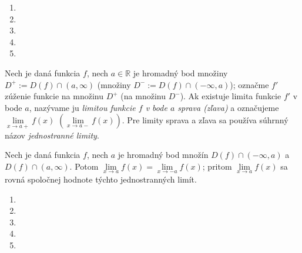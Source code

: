 \begin{enumerate}[resume]
  \item {}
  \item {}
  \item {}
  \item {}
  \item {}
\end{enumerate}

Nech je daná funkcia $f$, nech $a \in \mathbb{R}$ je hromadný bod množiny
$D^+:=D(f)\cap (a,\infty)$ (množiny $D^-:=D(f)\cap (-\infty,a)$); označme $f'$
zúženie funkcie na množinu $D^+$ (na množinu $D^-$). Ak existuje limita funkcie
$f'$ v bode $a$, nazývame ju \textit{limitou funkcie $f$ v bode $a$ sprava
(zľava)} a označujeme $\lim\limits_{x \rightarrow a+} f(x)$ $(\lim\limits_{x
\rightarrow a-} f(x))$. Pre limity sprava a zľava sa používa súhrnný názov
\textit{jednostranné limity}.

\begin{veta}
Nech je daná funkcia $f$, nech $a$ je hromadný bod množín $D(f) \cap
(-\infty,a)$ a $D(f) \cap (a,\infty)$. Potom $\lim\limits_{x \rightarrow a}
f(x)=\lim\limits_{x \rightarrow -a} f(x)$; pritom $\lim\limits_{x \rightarrow a}
f(x)$ sa rovná spoločnej hodnote týchto jednostranných limít.
\end{veta}

\begin{enumerate}[resume]
  \item {}
  \item {}
  \item {}
  \item {}
  \item {}
\end{enumerate}
